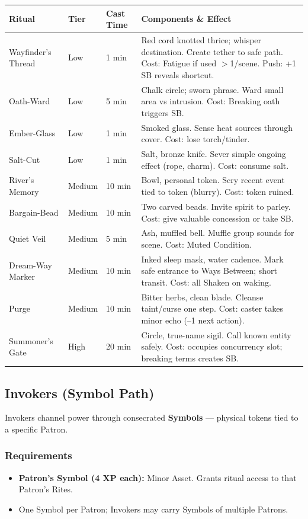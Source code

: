 \begin{tabular}{@{}lllp{4cm}@{}}
\toprule
\textbf{Ritual} & \textbf{Tier} & \textbf{Cast Time} & \textbf{Components \& Effect} \\
\midrule
Wayfinder's Thread & Low & 1 min & Red cord knotted thrice; whisper destination. Create tether to safe path. Cost: Fatigue if used $>$1/scene. Push: +1 SB reveals shortcut. \\
Oath-Ward & Low & 5 min & Chalk circle; sworn phrase. Ward small area vs intrusion. Cost: Breaking oath triggers SB. \\
Ember-Glass & Low & 1 min & Smoked glass. Sense heat sources through cover. Cost: lose torch/tinder. \\
Salt-Cut & Low & 1 min & Salt, bronze knife. Sever simple ongoing effect (rope, charm). Cost: consume salt. \\
River's Memory & Medium & 10 min & Bowl, personal token. Scry recent event tied to token (blurry). Cost: token ruined. \\
Bargain-Bead & Medium & 10 min & Two carved beads. Invite spirit to parley. Cost: give valuable concession or take SB. \\
Quiet Veil & Medium & 5 min & Ash, muffled bell. Muffle group sounds for scene. Cost: Muted Condition. \\
Dream-Way Marker & Medium & 10 min & Inked sleep mask, water cadence. Mark safe entrance to Ways Between; short transit. Cost: all Shaken on waking. \\
Purge & Medium & 10 min & Bitter herbs, clean blade. Cleanse taint/curse one step. Cost: caster takes minor echo (--1 next action). \\
Summoner's Gate & High & 20 min & Circle, true-name sigil. Call known entity safely. Cost: occupies concurrency slot; breaking terms creates SB. \\
\bottomrule
\end{tabular}

\subsection{Invokers (Symbol Path)}

Invokers channel power through consecrated \textbf{Symbols} --- physical tokens tied to a specific Patron.

\subsubsection{Requirements}
\begin{itemize}
  \item \textbf{Patron's Symbol (4 XP each):} Minor Asset. Grants ritual access to that Patron's Rites.
  \item One Symbol per Patron; Invokers may carry Symbols of multiple Patrons.
\end{itemize}

